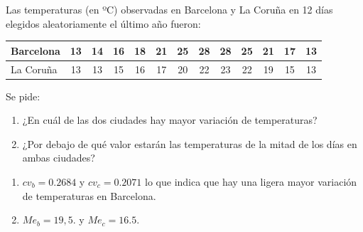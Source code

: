 {Las temperaturas (en ºC) observadas en Barcelona y La Coruña en 12 días elegidos aleatoriamente el último año fueron:
\begin{center}
\begin{tabular}{|l|cccccccccccc|}
\hline
Barcelona & 13 & 14 & 16 & 18 & 21 & 25 & 28 & 28 & 25 & 21 & 17 & 13\\ \hline
La Coruña & 13 & 13 & 15 & 16 & 17 & 20 & 22 & 23 & 22 & 19 & 15 & 13\\ \hline
\end{tabular}
\end{center}
Se pide:

\begin{enumerate}
\item ¿En cuál de las dos ciudades hay mayor variación de temperaturas?
\item ¿Por debajo de qué valor estarán las temperaturas de la mitad de los días en ambas ciudades?
\end{enumerate}
}
{\begin{enumerate}
\item $cv_b = 0.2684$ y $cv_c =0.2071$ lo que indica que hay una ligera mayor variación de temperaturas en Barcelona.
\item $Me_b = 19,5.$ y $Me_c= 16.5$.
\end{enumerate}
}
